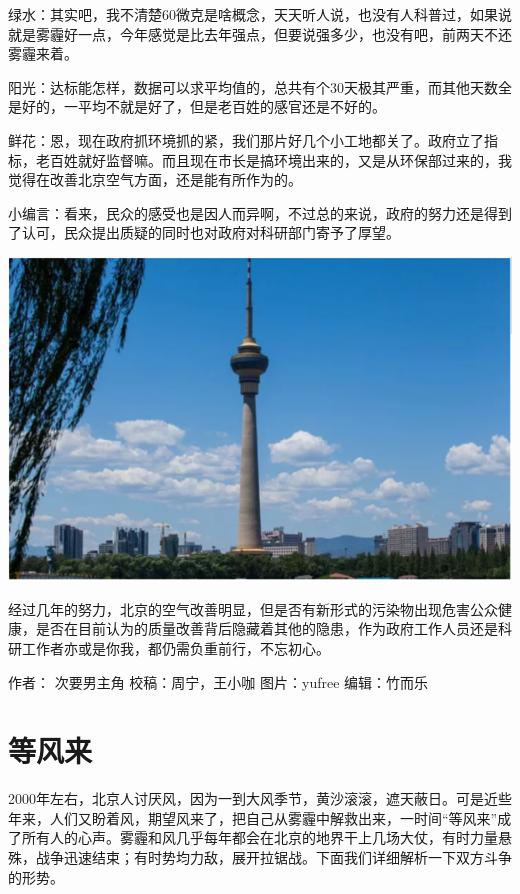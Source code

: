\documentclass[]{book}
\begin{document}
绿水：其实吧，我不清楚60微克是啥概念，天天听人说，也没有人科普过，如果说就是雾霾好一点，今年感觉是比去年强点，但要说强多少，也没有吧，前两天不还雾霾来着。

阳光：达标能怎样，数据可以求平均值的，总共有个30天极其严重，而其他天数全是好的，一平均不就是好了，但是老百姓的感官还是不好的。

鲜花：恩，现在政府抓环境抓的紧，我们那片好几个小工地都关了。政府立了指标，老百姓就好监督嘛。而且现在市长是搞环境出来的，又是从环保部过来的，我觉得在改善北京空气方面，还是能有所作为的。

小编言：看来，民众的感受也是因人而异啊，不过总的来说，政府的努力还是得到了认可，民众提出质疑的同时也对政府对科研部门寄予了厚望。

\includegraphics[width=8.33in]{images/air5}

经过几年的努力，北京的空气改善明显，但是否有新形式的污染物出现危害公众健康，是否在目前认为的质量改善背后隐藏着其他的隐患，作为政府工作人员还是科研工作者亦或是你我，都仍需负重前行，不忘初心。

作者： 次要男主角
校稿：周宁，王小咖
图片：yufree
编辑：竹而乐

\hypertarget{ux7b49ux98ceux6765}{%
\section{等风来}\label{ux7b49ux98ceux6765}}

2000年左右，北京人讨厌风，因为一到大风季节，黄沙滚滚，遮天蔽日。可是近些年来，人们又盼着风，期望风来了，把自己从雾霾中解救出来，一时间``等风来''成了所有人的心声。雾霾和风几乎每年都会在北京的地界干上几场大仗，有时力量悬殊，战争迅速结束；有时势均力敌，展开拉锯战。下面我们详细解析一下双方斗争的形势。
\end{document}
